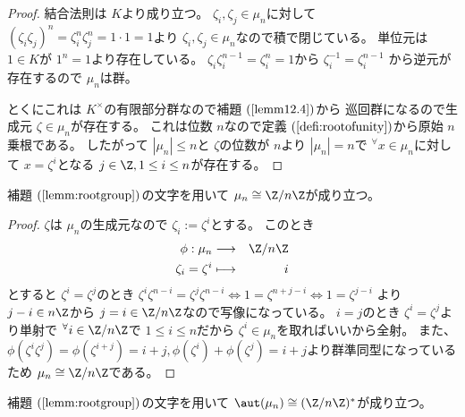 \documentclass[../master_galois_theory]{subfiles}
\begin{document}
\begin{proof}
  結合法則は $K$より成り立つ。
  $\zeta_i , \zeta_j \in \mu_n$に対して $(\zeta_i \zeta_j)^n = \zeta_i^n \zeta_j^n = 1 \cdot 1 = 1$より $\zeta_i , \zeta_j \in \mu_n$なので積で閉じている。
  単位元は $1 \in K$が $1^n = 1$より存在している。
  $\zeta_i \zeta_i^{n-1} = \zeta_i^n = 1$から $\zeta_i^{-1} = \zeta_i^{n-1}$
  から逆元が存在するので $\mu_n$は群。

  とくにこれは $K^\times$の有限部分群なので補題 $(\mathrm{\ref{lemm12.4}})$から
  巡回群になるので生成元 $\zeta \in \mu_n$が存在する。
  これは位数 $n$なので定義 $(\mathrm{\ref{defi:rootofunity}})$から原始 $n$乗根である。
  したがって $|\mu_n| \leq n$と $\zeta$の位数が $n$より $|\mu_n| = n$で
  ${}^\forall x \in \mu_n$に対して $x = \zeta^i$となる
  $j \in \Z , 1 \leq i \leq n$が存在する。
\end{proof}

\begin{lemm} \label{lemm:rootcong1}
  補題 $(\mathrm{\ref{lemm:rootgroup}})$の文字を用いて
  $\mu_n \cong \Z/n\Z$が成り立つ。
\end{lemm}

\begin{proof}
  $\zeta$は $\mu_n$の生成元なので
  $\zeta_i := \zeta^i$とする。
  このとき
  \begin{eqnarray*}
    \phi : \mu_n & \longrightarrow & \Z/n\Z \\
    \zeta_i = \zeta^i & \longmapsto & i
  \end{eqnarray*}
  とすると $\zeta^i = \zeta^j$のとき $\zeta^i \zeta^{n-i} = \zeta^j \zeta^{n-i} \Leftrightarrow 1 = \zeta^{n+j-i} \Leftrightarrow 1 = \zeta^{j-i}$
  より $j - i \in n\Z$から $j = i \in \Z/n\Z$なので写像になっている。
  $i = j$のとき $\zeta^i = \zeta^j$より単射で
  ${}^\forall i \in \Z/n\Z$で $1 \leq i \leq n$だから
  $\zeta^i \in \mu_n$を取ればいいから全射。
  また、 $\phi(\zeta^i \zeta^j) = \phi(\zeta^{i+j}) = i + j ,
  \phi(\zeta^i) + \phi(\zeta^j) = i + j$より群準同型になっているため
  $\mu_n \cong \Z/n\Z$である。
\end{proof}

\begin{lemm} \label{lemm:rootcong2}
  補題 $(\mathrm{\ref{lemm:rootgroup}})$の文字を用いて
  $\aut(\mu_n) \cong (\Z/n\Z)^*$が成り立つ。
\end{lemm}
\end{document}
